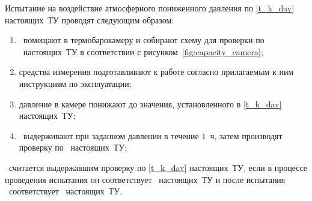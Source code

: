 Испытание на воздействие атмосферного пониженного давления по \ref{t_k_dav} настоящих~ТУ проводят следующим образом:

\begin{enumerate}
	\item \dut \ помещают в термобарокамеру и собирают схему для проверки по \treb \ настоящих~ТУ в соответствии с рисунком~\ref{fig:capacity_camera};
	\item средства измерения подготавливают к работе согласно прилагаемым к ним инструкциям по эксплуатации;
	\item давление в камере понижают до значения, установленного в \ref{t_k_dav} настоящих~ТУ; 
	\item \dut \ выдерживают при заданном давлении в течение $1$~ч, затем производят проверку по \treb \ настоящих~ТУ;
\end{enumerate}

\dut \ считается выдержавшим проверку по \ref{t_k_dav} настоящих~ТУ, если в процессе проведения испытания он соответствует \treb \ настоящих~ТУ и после испытания \dut \ соответствует \trebafter \ настоящих~ТУ.